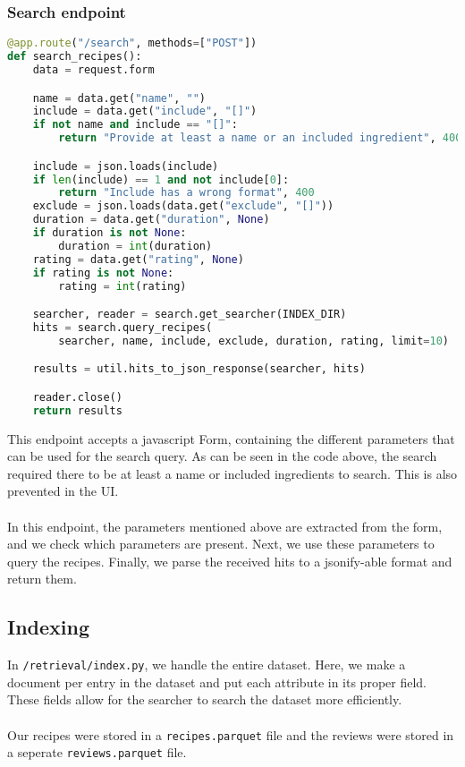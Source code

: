 \documentclass{article}
\begin{document}
\subsubsection{Search endpoint}
\begin{lstlisting}[language=Python]
@app.route("/search", methods=["POST"])
def search_recipes():
    data = request.form

    name = data.get("name", "")
    include = data.get("include", "[]")
    if not name and include == "[]":
        return "Provide at least a name or an included ingredient", 400

    include = json.loads(include)
    if len(include) == 1 and not include[0]:
        return "Include has a wrong format", 400
    exclude = json.loads(data.get("exclude", "[]"))
    duration = data.get("duration", None)
    if duration is not None:
        duration = int(duration)
    rating = data.get("rating", None)
    if rating is not None:
        rating = int(rating)

    searcher, reader = search.get_searcher(INDEX_DIR)
    hits = search.query_recipes(
        searcher, name, include, exclude, duration, rating, limit=10)

    results = util.hits_to_json_response(searcher, hits)

    reader.close()
    return results
\end{lstlisting}
This endpoint accepts a javascript Form, containing the different parameters
that can be used for the search query. As can be seen in the code above,
the search required there to be at least a name or included ingredients to search.
This is also prevented in the UI.
\\~\\
In this endpoint, the parameters mentioned above are extracted from the form,
and we check which parameters are present. Next, we use these parameters
to query the recipes.
Finally, we parse the received hits to a jsonify-able format and return them.
\newpage
\subsection{Indexing}
In \texttt{/retrieval/index.py}, we handle the entire dataset. Here, we make a
document per entry in the dataset and put each attribute in its proper field.
These fields allow for the searcher to search the dataset more efficiently.\\~\\
Our recipes were stored in a \texttt{recipes.parquet} file and the reviews were
stored in a seperate \texttt{reviews.parquet} file.
\end{document}
